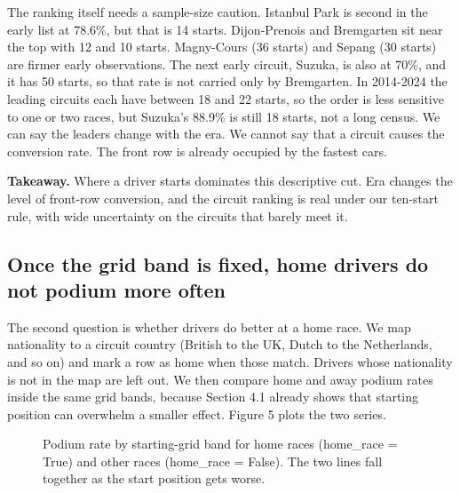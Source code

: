 \documentclass[10pt,a4paper]{article}
\begin{document}
The ranking itself needs a sample-size caution. Istanbul Park is second in the early list at 78.6\%, but that is 14 starts. Dijon-Prenois and Bremgarten sit near the top with 12 and 10 starts. Magny-Cours (36 starts) and Sepang (30 starts) are firmer early observations. The next early circuit, Suzuka, is also at 70\%, and it has 50 starts, so that rate is not carried only by Bremgarten. In 2014-2024 the leading circuits each have between 18 and 22 starts, so the order is less sensitive to one or two races, but Suzuka's 88.9\% is still 18 starts, not a long census. We can say the leaders change with the era. We cannot say that a circuit causes the conversion rate. The front row is already occupied by the fastest cars.


\begin{takeaway}
\textbf{Takeaway.} Where a driver starts dominates this descriptive cut. Era changes the level of front-row conversion, and the circuit ranking is real under our ten-start rule, with wide uncertainty on the circuits that barely meet it.
\end{takeaway}



\subsection{Once the grid band is fixed, home drivers do not podium more often}


The second question is whether drivers do better at a home race. We map nationality to a circuit country (British to the UK, Dutch to the Netherlands, and so on) and mark a row as home when those match. Drivers whose nationality is not in the map are left out. We then compare home and away podium rates inside the same grid bands, because Section 4.1 already shows that starting position can overwhelm a smaller effect. Figure 5 plots the two series.


\begin{figure}[H]
\centering
{}
\caption{Podium rate by starting-grid band for home races (home\_race = True) and other races (home\_race = False). The two lines fall together as the start position gets worse.}
\end{figure}
\end{document}
